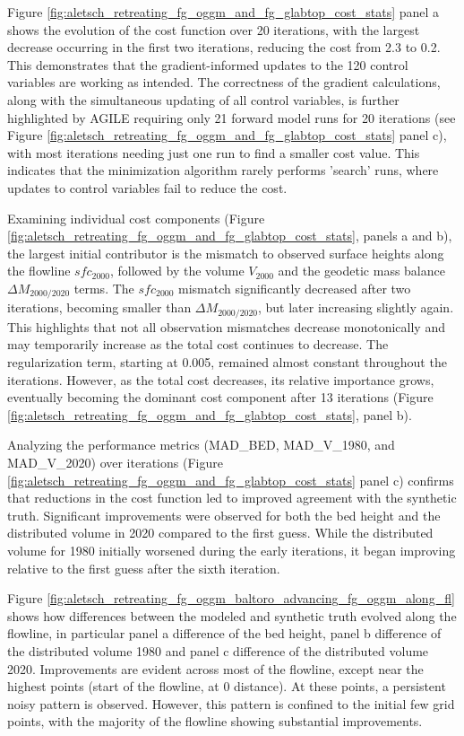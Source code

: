 \documentclass[journal abbreviation, manuscript]{copernicus}
\begin{document}
Figure \ref{fig:aletsch_retreating_fg_oggm_and_fg_glabtop_cost_stats} panel a shows the evolution of the cost function over 20 iterations, with the largest decrease occurring in the first two iterations, reducing the cost from 2.3 to 0.2. This demonstrates that the gradient-informed updates to the 120 control variables are working as intended. The correctness of the gradient calculations, along with the simultaneous updating of all control variables, is further highlighted by AGILE requiring only 21 forward model runs for 20 iterations (see Figure \ref{fig:aletsch_retreating_fg_oggm_and_fg_glabtop_cost_stats} panel c), with most iterations needing just one run to find a smaller cost value. This indicates that the minimization algorithm rarely performs 'search' runs, where updates to control variables fail to reduce the cost.

Examining individual cost components (Figure \ref{fig:aletsch_retreating_fg_oggm_and_fg_glabtop_cost_stats}, panels a and b), the largest initial contributor is the mismatch to observed surface heights along the flowline $sfc_{2000}$, followed by the volume $V_{2000}$ and the geodetic mass balance $\Delta M_{2000/2020}$ terms. The $sfc_{2000}$ mismatch significantly decreased after two iterations, becoming smaller than $\Delta M_{2000/2020}$, but later increasing slightly again. This highlights that not all observation mismatches decrease monotonically and may temporarily increase as the total cost continues to decrease. The regularization term, starting at 0.005, remained almost constant throughout the iterations. However, as the total cost decreases, its relative importance grows, eventually becoming the dominant cost component after 13 iterations (Figure \ref{fig:aletsch_retreating_fg_oggm_and_fg_glabtop_cost_stats}, panel b).

Analyzing the performance metrics (MAD\_BED, MAD\_V\_1980, and MAD\_V\_2020) over iterations (Figure \ref{fig:aletsch_retreating_fg_oggm_and_fg_glabtop_cost_stats} panel c) confirms that reductions in the cost function led to improved agreement with the synthetic truth. Significant improvements were observed for both the bed height and the distributed volume in 2020 compared to the first guess. While the distributed volume for 1980 initially worsened during the early iterations, it began improving relative to the first guess after the sixth iteration.

Figure \ref{fig:aletsch_retreating_fg_oggm_baltoro_advancing_fg_oggm_along_fl} shows how differences between the modeled and synthetic truth evolved along the flowline, in particular panel a difference of the bed height, panel b difference of the distributed volume 1980 and panel c difference of the distributed volume 2020. Improvements are evident across most of the flowline, except near the highest points (start of the flowline, at 0 distance). At these points, a persistent noisy pattern is observed. However, this pattern is confined to the initial few grid points, with the majority of the flowline showing substantial improvements.
\end{document}
